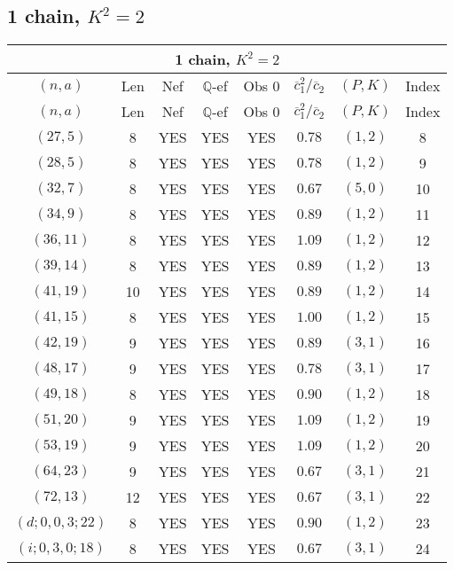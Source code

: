 \subsection{1 chain, $K^2 = 2$}
\begin{longtable}{|c|c|c|c|c|c|c|c|}
\hline
\multicolumn{8}{|c|}{1 chain, $K^2 = 2$}\\
\hline
$(n,a)$ & Len & Nef & $\mathbb Q$-ef & Obs 0 & $\overline c_1^2 / \overline c_2$ & $(P,K)$ & Index\\
\hline
\endfirsthead

\hline
$(n,a)$ & Len & Nef & $\mathbb Q$-ef & Obs 0 & $\overline c_1^2 / \overline c_2$ & $(P,K)$ & Index\\
\hline
\endhead
\hline
\endfoot

$(27,5)$ & 8 & YES & YES & YES & $0.78$ & $(1,2)$ & 8\\
$(28,5)$ & 8 & YES & YES & YES & $0.78$ & $(1,2)$ & 9\\
$(32,7)$ & 8 & YES & YES & YES & $0.67$ & $(5,0)$ & 10\\
$(34,9)$ & 8 & YES & YES & YES & $0.89$ & $(1,2)$ & 11\\
$(36,11)$ & 8 & YES & YES & YES & $1.09$ & $(1,2)$ & 12\\
$(39,14)$ & 8 & YES & YES & YES & $0.89$ & $(1,2)$ & 13\\
$(41,19)$ & 10 & YES & YES & YES & $0.89$ & $(1,2)$ & 14\\
$(41,15)$ & 8 & YES & YES & YES & $1.00$ & $(1,2)$ & 15\\
$(42,19)$ & 9 & YES & YES & YES & $0.89$ & $(3,1)$ & 16\\
$(48,17)$ & 9 & YES & YES & YES & $0.78$ & $(3,1)$ & 17\\
$(49,18)$ & 8 & YES & YES & YES & $0.90$ & $(1,2)$ & 18\\
$(51,20)$ & 9 & YES & YES & YES & $1.09$ & $(1,2)$ & 19\\
$(53,19)$ & 9 & YES & YES & YES & $1.09$ & $(1,2)$ & 20\\
$(64,23)$ & 9 & YES & YES & YES & $0.67$ & $(3,1)$ & 21\\
$(72,13)$ & 12 & YES & YES & YES & $0.67$ & $(3,1)$ & 22\\
$(d;0,0,3;22)$ & 8 & YES & YES & YES & $0.90$ & $(1,2)$ & 23\\
$(i;0,3,0;18)$ & 8 & YES & YES & YES & $0.67$ & $(3,1)$ & 24
\end{longtable}
